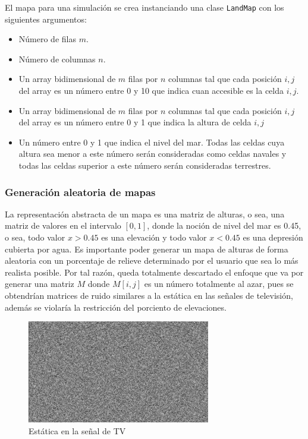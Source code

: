 El mapa para una simulación se crea instanciando una clase \verb|LandMap| con los siguientes argumentos:

\begin{itemize}
	\item Número de filas $m$.
	\item Número de columnas $n$.
	\item Un array bidimensional de $m$ filas por $n$ columnas tal que cada posición $i,j$ del array es un número entre 0 y 10 que indica cuan accesible es la celda $i,j$.
	\item Un array bidimensional de $m$ filas por $n$ columnas tal que cada posición $i,j$ del array es un número entre 0 y 1 que indica la altura de celda $i,j$
	\item Un número entre 0 y 1 que indica el nivel del mar. Todas las celdas cuya altura sea menor a este número serán consideradas como celdas navales y todas las celdas superior a este número serán consideradas terrestres.
\end{itemize}

\subsubsection{Generación aleatoria de mapas}

La representación abstracta de un mapa es una matriz de alturas, o sea, una matriz de valores en el intervalo $[0,1]$, donde la noción de nivel del mar es 0.45, o sea, todo valor $x > 0.45$ es una elevación y todo valor $x < 0.45$ es una depresión cubierta por agua. Es importante poder generar un mapa de alturas de forma aleatoria con un porcentaje de relieve determinado por el usuario que sea lo más realista posible. Por tal razón, queda totalmente descartado el enfoque que va por generar una matriz $M$ donde $M[i,j]$ es un número totalmente al azar, pues se obtendrían matrices de ruido similares a la estática en las señales de televisión, además se violaría la restricción del porciento de elevaciones.

\begin{figure}
	\centering
	\includegraphics[width=8cm]{chapters/img/estatica.jpg}
	\caption{Estática en la señal de TV}
\end{figure}


